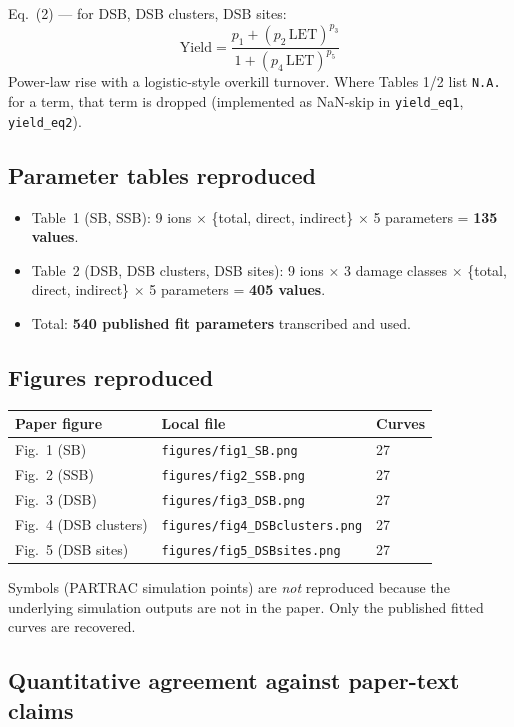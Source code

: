 \documentclass[11pt]{article}
\begin{document}
Eq.~(2) --- for DSB, DSB clusters, DSB sites:
\[
\text{Yield} = \frac{p_1 + (p_2\,\text{LET})^{p_3}}{1 + (p_4\,\text{LET})^{p_5}}
\]
Power-law rise with a logistic-style overkill turnover. Where Tables 1/2 list \texttt{N.A.} for a term, that term is dropped (implemented as NaN-skip in \texttt{yield\_eq1}, \texttt{yield\_eq2}).

\subsection{Parameter tables reproduced}

\begin{itemize}
  \item Table~1 (SB, SSB): 9 ions $\times$ \{total, direct, indirect\} $\times$ 5 parameters = \textbf{135 values}.
  \item Table~2 (DSB, DSB clusters, DSB sites): 9 ions $\times$ 3 damage classes $\times$ \{total, direct, indirect\} $\times$ 5 parameters = \textbf{405 values}.
  \item Total: \textbf{540 published fit parameters} transcribed and used.
\end{itemize}

\subsection{Figures reproduced}

\begin{tabular}{lll}
\toprule
Paper figure & Local file & Curves \\
\midrule
Fig.~1 (SB)           & \texttt{figures/fig1\_SB.png}          & 27 \\
Fig.~2 (SSB)          & \texttt{figures/fig2\_SSB.png}         & 27 \\
Fig.~3 (DSB)          & \texttt{figures/fig3\_DSB.png}         & 27 \\
Fig.~4 (DSB clusters) & \texttt{figures/fig4\_DSBclusters.png} & 27 \\
Fig.~5 (DSB sites)    & \texttt{figures/fig5\_DSBsites.png}    & 27 \\
\bottomrule
\end{tabular}

Symbols (PARTRAC simulation points) are \emph{not} reproduced because the underlying simulation outputs are not in the paper. Only the published fitted curves are recovered.

\subsection{Quantitative agreement against paper-text claims}
\end{document}
